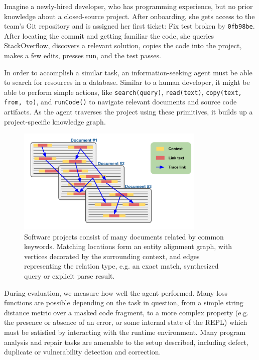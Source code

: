 \documentclass[11pt]{article}
\begin{document}
Imagine a newly-hired developer, who has programming experience, but no prior knowledge about a closed-source project. After onboarding, she gets access to the team's Git repository and is assigned her first ticket: Fix test broken by \texttt{0fb98be}. After locating the commit and getting familiar the code, she queries StackOverflow, discovers a relevant solution, copies the code into the project, makes a few edits, presses run, and the test passes.

In order to accomplish a similar task, an information-seeking agent must be able to search for resources in a database. Similar to a human developer, it might be able to perform simple actions, like \texttt{search(query)}, \texttt{read(text)}, \texttt{copy(text, from, to)}, and \texttt{runCode()} to navigate relevant documents and source code artifacts. As the agent traverses the project using these primitives, it builds up a project-specific knowledge graph.

\begin{figure}
  \centering
  \includegraphics[width=0.8\textwidth]{use_graph}
  \caption{Software projects consist of many documents related by common keywords. Matching locations form an entity alignment graph, with vertices decorated by the surrounding context, and edges representing the relation type, e.g. an exact match, synthesized query or explicit parse result.}
\end{figure}

During evaluation, we measure how well the agent performed. Many loss functions are possible depending on the task in question, from a simple string distance metric over a masked code fragment, to a more complex property (e.g. the presence or absence of an error, or some internal state of the REPL) which must be satisfied by interacting with the runtime environment. Many program analysis and repair tasks are amenable to the setup described, including defect, duplicate or vulnerability detection and correction.
\end{document}
